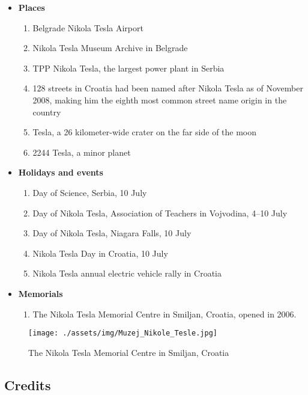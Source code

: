 \documentclass[
]{article}
\providecommand{\tightlist}{%
  \setlength{\itemsep}{0pt}\setlength{\parskip}{0pt}}
\begin{document}
\begin{itemize}
\tightlist
\item
  \textbf{Places}

  \begin{enumerate}
  \def\labelenumi{\arabic{enumi}.}
  \tightlist
  \item
    Belgrade Nikola Tesla Airport
  \item
    Nikola Tesla Museum Archive in Belgrade
  \item
    TPP Nikola Tesla, the largest power plant in Serbia
  \item
    128 streets in Croatia had been named after Nikola Tesla as of
    November 2008, making him the eighth most common street name origin
    in the country
  \item
    Tesla, a 26 kilometer-wide crater on the far side of the moon
  \item
    2244 Tesla, a minor planet
  \end{enumerate}
\item
  \textbf{Holidays and events}

  \begin{enumerate}
  \def\labelenumi{\arabic{enumi}.}
  \tightlist
  \item
    Day of Science, Serbia, 10 July
  \item
    Day of Nikola Tesla, Association of Teachers in Vojvodina, 4--10
    July
  \item
    Day of Nikola Tesla, Niagara Falls, 10 July
  \item
    Nikola Tesla Day in Croatia, 10 July
  \item
    Nikola Tesla annual electric vehicle rally in Croatia
  \end{enumerate}
\item
  \textbf{Memorials}

  \begin{enumerate}
  \def\labelenumi{\arabic{enumi}.}
  \tightlist
  \item
    The Nikola Tesla Memorial Centre in Smiljan, Croatia, opened in
    2006.
  \end{enumerate}
\end{itemize}

\begin{figure}
\centering
\texttt{[image: ./assets/img/Muzej\_Nikole\_Tesle.jpg]}
\caption{The Nikola Tesla Memorial Centre in Smiljan, Croatia}
\end{figure}

\hypertarget{credits}{%
\subsection{Credits}\label{credits}}
\end{document}
